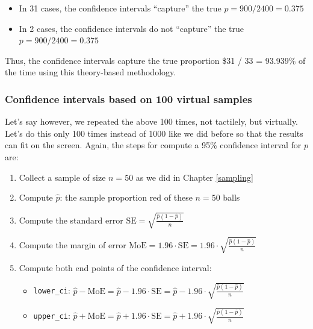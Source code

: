 \documentclass[12pt,]{krantz}
\providecommand{\tightlist}{%
  \setlength{\itemsep}{0pt}\setlength{\parskip}{0pt}}
\theoremstyle{definition}
\theoremstyle{definition}
\theoremstyle{definition}
\theoremstyle{remark}
\begin{document}
\begin{itemize}
\tightlist
\item
  In 31 cases, the confidence intervals ``capture'' the true
  \(p = 900 / 2400 = 0.375\)
\item
  In 2 cases, the confidence intervals do not ``capture'' the true
  \(p = 900 / 2400 = 0.375\)
\end{itemize}

Thus, the confidence intervals capture the true proportion \$31 / 33 =
93.939\% of the time using this theory-based methodology.

\subsubsection*{Confidence intervals based on 100 virtual
samples}\label{confidence-intervals-based-on-100-virtual-samples}

Let's say however, we repeated the above 100 times, not tactilely, but
virtually. Let's do this only 100 times instead of 1000 like we did
before so that the results can fit on the screen. Again, the steps for
compute a 95\% confidence interval for \(p\) are:

\begin{enumerate}
\def\labelenumi{\arabic{enumi}.}
\tightlist
\item
  Collect a sample of size \(n = 50\) as we did in Chapter
  \ref{sampling}
\item
  Compute \(\widehat{p}\): the sample proportion red of these \(n=50\)
  balls
\item
  Compute the standard error
  \(\text{SE} = \sqrt{\frac{\widehat{p}(1-\widehat{p})}{n}}\)
\item
  Compute the margin of error
  \(\text{MoE} = 1.96 \cdot \text{SE} = 1.96 \cdot \sqrt{\frac{\widehat{p}(1-\widehat{p})}{n}}\)
\item
  Compute both end points of the confidence interval:

  \begin{itemize}
  \tightlist
  \item
    \texttt{lower\_ci}:
    \(\widehat{p} - \text{MoE} = \widehat{p} - 1.96 \cdot \text{SE} = \widehat{p} - 1.96 \cdot \sqrt{\frac{\widehat{p}(1-\widehat{p})}{n}}\)
  \item
    \texttt{upper\_ci}:
    \(\widehat{p} + \text{MoE} = \widehat{p} + 1.96 \cdot \text{SE} = \widehat{p} +1.96 \cdot \sqrt{\frac{\widehat{p}(1-\widehat{p})}{n}}\)
  \end{itemize}
\end{enumerate}
\end{document}
